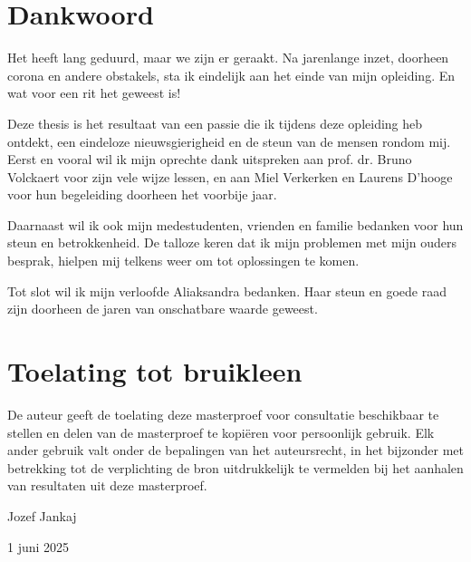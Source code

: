 \documentclass[english]{article}
\begin{document}

	\section*{Dankwoord}
	
	Het heeft lang geduurd, maar we zijn er geraakt. Na jarenlange inzet, doorheen corona en andere obstakels, sta ik eindelijk aan het einde van mijn opleiding. En wat voor een rit het geweest is!
	
	Deze thesis is het resultaat van een passie die ik tijdens deze opleiding heb ontdekt, een eindeloze nieuwsgierigheid en de steun van de mensen rondom mij. Eerst en vooral wil ik mijn oprechte dank uitspreken aan prof. dr. Bruno Volckaert voor zijn vele wijze lessen, en aan Miel Verkerken en Laurens D'hooge voor hun begeleiding doorheen het voorbije jaar.
	
	Daarnaast wil ik ook mijn medestudenten, vrienden en familie bedanken voor hun steun en betrokkenheid. De talloze keren dat ik mijn problemen met mijn ouders besprak, hielpen mij telkens weer om tot oplossingen te komen.
	
	Tot slot wil ik mijn verloofde Aliaksandra bedanken. Haar steun en goede raad zijn doorheen de jaren van onschatbare waarde geweest.
	
	\newpage
	\section*{Toelating tot bruikleen}
	De auteur geeft de toelating deze masterproef voor consultatie beschikbaar te stellen en delen van de masterproef te kopiëren voor persoonlijk gebruik. Elk ander gebruik valt onder de bepalingen van het auteursrecht, in het bijzonder met betrekking tot de verplichting de bron uitdrukkelijk te vermelden bij het aanhalen van resultaten uit deze masterproef.
	
	\raggedleft
	Jozef Jankaj
	
	1 juni 2025
\end{document}
